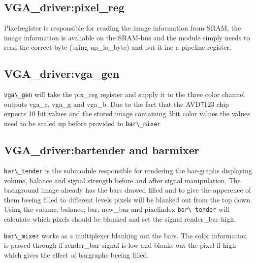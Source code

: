 \subsection{VGA\_driver:pixel\_reg}
Pixelregister is responsible for reading the image information from SRAM, the image information is avaliable
on the SRAM-bus and the module simply needs to read the correct byte (using up\_lo\_byte) and put it ine a pipeline
register.

\subsection{VGA\_driver:vga\_gen}
\verb+vga\_gen+ will take the pix\_reg register and supply it to the three color channel outputs 
vga\_r, vga\_g and vga\_b. Due to the fact that the AVD7123 chip expects 10 bit values and the stored image
containing 3bit color values the values need to be scaled up before provided to \verb+bar\_mixer+ 

\subsection{VGA\_driver:bartender and barmixer}\label{bartender}
\verb+bar\_tender+ is the submodule responsible for rendering the bar-graphs displaying volume, balance and
signal strength before and after signal manipulation. The background image already has the bars drawed filled
and to give the apperence of them beeing filled to different levels pixels will be blanked out from the top down. Using the volume, balance, bar, new\_bar and pixelindex \verb+bar\_tender+ will calculate which pixels should
be blanked and set the signal render\_bar high.

\verb+bar\_mixer+ works as a multiplexer blanking out the bars. The color information is passed through if render\_bar signal is low and blanks out the pixel if high which gives the effect of bargraphs beeing filled.
